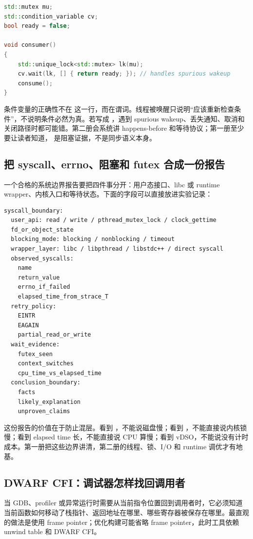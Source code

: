 \begin{lstlisting}[language=C++,caption={条件变量必须围绕谓词等待}]
std::mutex mu;
std::condition_variable cv;
bool ready = false;

void consumer()
{
    std::unique_lock<std::mutex> lk(mu);
    cv.wait(lk, [] { return ready; }); // handles spurious wakeup
    consume();
}
\end{lstlisting}

条件变量的正确性不在  这一行，而在谓词。线程被唤醒只说明“应该重新检查条件”，不说明条件必然为真。若写成 ，遇到 spurious wakeup、丢失通知、取消和关闭路径时都可能错。第二册会系统讲 happens-before 和等待协议；第一册至少要让读者知道， 是阻塞证据，不是同步语义本身。

\subsection{把 syscall、errno、阻塞和 futex 合成一份报告}

一个合格的系统边界报告要把四件事分开：用户态接口、libc 或 runtime wrapper、内核入口和等待状态。下面的字段可以直接放进实验记录：

\begin{lstlisting}[numbers=none,caption={syscall/futex 证据包字段}]
syscall_boundary:
  user_api: read / write / pthread_mutex_lock / clock_gettime
  fd_or_object_state
  blocking_mode: blocking / nonblocking / timeout
  wrapper_layer: libc / libpthread / libstdc++ / direct syscall
  observed_syscalls:
    name
    return_value
    errno_if_failed
    elapsed_time_from_strace_T
  retry_policy:
    EINTR
    EAGAIN
    partial_read_or_write
  wait_evidence:
    futex_seen
    context_switches
    cpu_time_vs_elapsed_time
  conclusion_boundary:
    facts
    likely_explanation
    unproven_claims
\end{lstlisting}

这份报告的价值在于防止混层。看到 ，不能说磁盘慢；看到 ，不能直接说内核锁慢；看到 elapsed time 长，不能直接说 CPU 算慢；看到 vDSO，不能说没有计时成本。第一册把这些边界讲清，第二册的线程、锁、I/O 和 runtime 调优才有地基。

\subsection{DWARF CFI：调试器怎样找回调用者}

当 GDB、profiler 或异常运行时需要从当前指令位置回到调用者时，它必须知道当前函数如何移动了栈指针、返回地址在哪里、哪些寄存器被保存在哪里。最直观的做法是使用 frame pointer；优化构建可能省略 frame pointer，此时工具依赖 unwind table 和 DWARF CFI。

